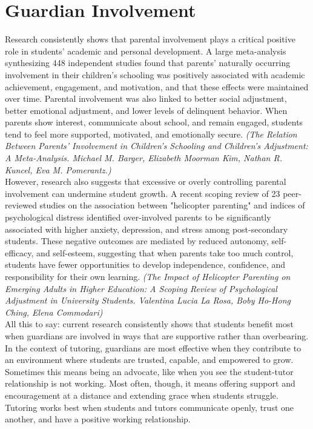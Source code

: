 \documentclass{article}
\begin{document}
\section{Guardian Involvement}
Research consistently shows that parental involvement plays a critical positive role in students’ academic and personal development. A large meta-analysis synthesizing 448 independent studies found that parents’ naturally occurring involvement in their children’s schooling was positively associated with academic achievement, engagement, and motivation, and that these effects were maintained over time. Parental involvement was also linked to better social adjustment, better emotional adjustment, and lower levels of delinquent behavior. When parents show interest, communicate about school, and remain engaged, students tend to feel more supported, motivated, and emotionally secure. \textit{(The Relation Between Parents’ Involvement in Children’s Schooling and Children’s Adjustment: A Meta-Analysis. Michael M. Barger, Elizabeth Moorman Kim, Nathan R. Kuncel, Eva M. Pomerantz.)}\\

However, research also suggests that excessive or overly controlling parental involvement can undermine student growth. A recent scoping review of 23 peer-reviewed studies on the association between "helicopter parenting" and indices of psychological distress identified over-involved parents to be significantly associated with higher anxiety, depression, and stress among post-secondary students. These negative outcomes are mediated by reduced autonomy, self-efficacy, and self-esteem, suggesting that when parents take too much control, students have fewer opportunities to develop independence, confidence, and responsibility for their own learning. \textit{(The Impact of Helicopter Parenting on Emerging Adults in Higher Education: A Scoping Review of Psychological Adjustment in University Students. Valentina Lucia La Rosa, Boby Ho-Hong Ching, Elena Commodari)}\\

All this to say: current research consistently shows that students benefit most when guardians are involved in ways that are supportive rather than overbearing.\\

In the context of tutoring, guardians are most effective when they contribute to an environment where students are trusted, capable, and empowered to grow. Sometimes this means being an advocate, like when you see the student-tutor relationship is not working. Most often, though, it means offering support and encouragement at a distance and extending grace when students struggle. Tutoring works best when students and tutors communicate openly, trust one another, and have a positive working relationship.\\
\end{document}
